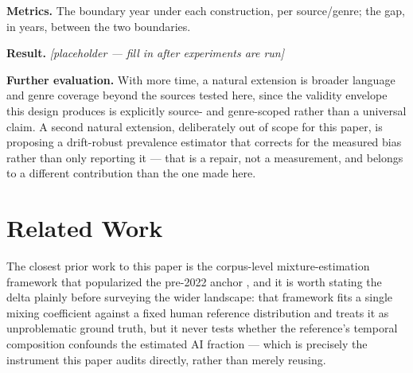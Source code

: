 \documentclass[11pt]{article}
\newcommand{\ph}{\textit{[placeholder --- fill in after experiments are run]}}
\begin{document}
\textbf{Metrics.} The boundary year under each construction, per source/genre; the gap, in years, between the two boundaries.

\textbf{Result.} \ph

\vspace{0.5em}
\noindent\textbf{Further evaluation.} With more time, a natural extension is broader language and genre coverage beyond the sources tested here, since the validity envelope this design produces is explicitly source- and genre-scoped rather than a universal claim. A second natural extension, deliberately out of scope for this paper, is proposing a drift-robust prevalence estimator that corrects for the measured bias rather than only reporting it --- that is a repair, not a measurement, and belongs to a different contribution than the one made here.

\section{Related Work}

The closest prior work to this paper is the corpus-level mixture-estimation framework that popularized the pre-2022 anchor \citep{MonitorAIScale}, and it is worth stating the delta plainly before surveying the wider landscape: that framework fits a single mixing coefficient against a fixed human reference distribution and treats it as unproblematic ground truth, but it never tests whether the reference's temporal composition confounds the estimated AI fraction --- which is precisely the instrument this paper audits directly, rather than merely reusing.
\end{document}
